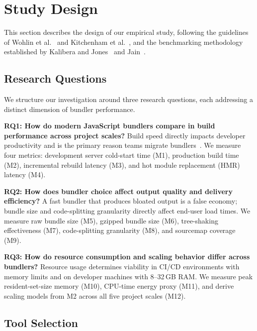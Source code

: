 \documentclass[preprint,12pt]{elsarticle}
\begin{document}
\section{Study Design}\label{sec:design}

This section describes the design of our empirical study, following the guidelines of Wohlin et al.~\cite{wohlin2012experimentation} and Kitchenham et al.~\cite{kitchenham2002preliminary}, and the benchmarking methodology established by Kalibera and Jones~\cite{kalibera2013rigorous} and Jain~\cite{jain1991art}.

\subsection{Research Questions}\label{sec:rqs}

We structure our investigation around three research questions, each addressing a distinct dimension of bundler performance.

\medskip\noindent\textbf{RQ1: How do modern JavaScript bundlers compare in build performance across project scales?}
Build speed directly impacts developer productivity and is the primary reason teams migrate bundlers~\cite{stateofjs2025}.
We measure four metrics: development server cold-start time (M1), production build time (M2), incremental rebuild latency (M3), and hot module replacement (HMR) latency (M4).

\medskip\noindent\textbf{RQ2: How does bundler choice affect output quality and delivery efficiency?}
A fast bundler that produces bloated output is a false economy; bundle size and code-splitting granularity directly affect end-user load times.
We measure raw bundle size (M5), gzipped bundle size (M6), tree-shaking effectiveness (M7), code-splitting granularity (M8), and sourcemap coverage (M9).

\medskip\noindent\textbf{RQ3: How do resource consumption and scaling behavior differ across bundlers?}
Resource usage determines viability in CI/CD environments with memory limits and on developer machines with 8--32\,GB RAM.
We measure peak resident-set-size memory (M10), CPU-time energy proxy (M11), and derive scaling models from M2 across all five project scales (M12).

\subsection{Tool Selection}\label{sec:tools}
\end{document}
